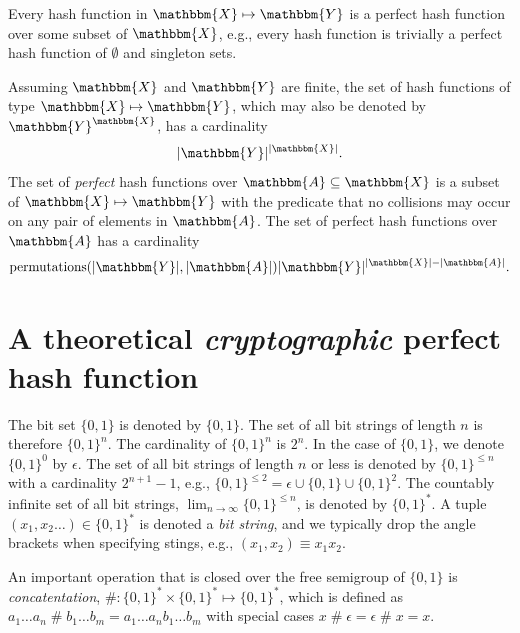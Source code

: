 \documentclass[hidelinks,11pt,final]{article}
\theoremstyle{plain}
\newcommand{\cat}{\mathbin{\#}}
\begin{document}
Every hash function in $\mathbbm{X} \mapsto \mathbbm{Y}$ is a perfect hash function over some subset of $\mathbbm{X}$, e.g., every hash function is trivially a perfect hash function of $\emptyset$ and singleton sets.

Assuming $\mathbbm{X}$ and $\mathbbm{Y}$ are finite, the set of hash functions of type $\mathbbm{X} \mapsto \mathbbm{Y}$, which may also be denoted by $\mathbbm{Y}^{\mathbbm{X}}$, has a cardinality
\begin{equation}
|\mathbbm{Y}|^{|\mathbbm{X}|}.
\end{equation}
The set of \emph{perfect} hash functions over $\mathbbm{A} \subseteq \mathbbm{X}$ is a subset of $\mathbbm{X} \mapsto \mathbbm{Y}$ with the predicate that no collisions may occur on any pair of elements in $\mathbbm{A}$.
The set of perfect hash functions over $\mathbbm{A}$ has a cardinality
\begin{equation}
\mathrm{permutations}(|\mathbbm{Y}|,|\mathbbm{A}|) |\mathbbm{Y}|^{|\mathbbm{X}| - |\mathbbm{A}|}.
\end{equation}


\section{A theoretical \emph{cryptographic} perfect hash function}
The bit set $\{0,1\}$ is denoted by $\{0,1\}$.
The set of all bit strings of length $n$ is therefore $\{0,1\}^n$.
The cardinality of $\{0,1\}^n$ is $2^n$.
In the case of $\{0,1\}$, we denote $\{0,1\}^0$ by $\epsilon$.
The set of all bit strings of length $n$ or less is denoted by $\{0,1\}^{\leq n}$ with a cardinality $2^{n+1}-1$, e.g., $\{0,1\}^{\leq 2} = \epsilon \cup \{0,1\} \cup \{0,1\}^2$.
The countably infinite set of all bit strings, $\lim_{n \to \infty} \{0,1\}^{\leq n}$, is denoted by $\{0,1\}^{*}$.
A tuple $(x_1,x_2\ldots) \in \{0,1\}^{*}$ is denoted a \emph{bit string}, and we typically drop the angle brackets when specifying stings, e.g., $(x_1,x_2) \equiv x_1 x_2$.

An important operation that is closed over the free semigroup of $\{0,1\}$ is \emph{concatentation}, $\cat : \{0,1\}^* \times \{0,1\}^* \mapsto \{0,1\}^*$, which is defined as $a_1 \ldots a_n \cat b_1 \ldots b_m = a_1 \ldots a_n b_1 \ldots b_m$ with special cases $x \cat \epsilon = \epsilon \cat x = x$.
\end{document}
